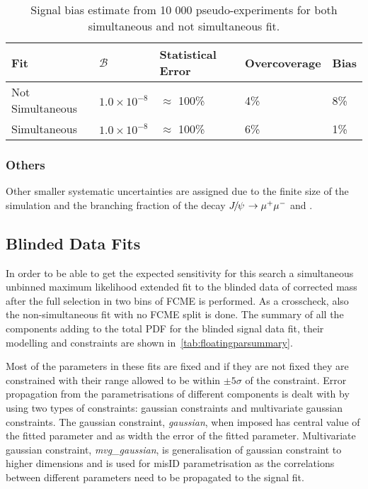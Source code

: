 \begin{table}[H]
\begin{center}
\begin{tabular}{ l  l  l  l  l }
\toprule
        Fit & $\mathcal{B}$ & Statistical Error & Overcoverage & Bias \\
\hline
        Not Simultaneous  & $1.0\times 10^{-8}$ & $\approx$ 100\% & 4\% & 8\%   \\
        Simultaneous  & $1.0\times 10^{-8}$ & $\approx$ 100\% & 6\% & 1\%   \\
\bottomrule
\end{tabular}
\end{center}
\caption{Signal bias estimate from 10 000 pseudo-experiments for both simultaneous and not simultaneous fit.}
\label{tab:biassum}
\end{table}


\subsubsection{Others}
Other smaller systematic uncertainties are assigned due to the finite size of the simulation and the branching fraction of the decay ${{J\mskip -3mu/\mskip -2mu\psi\mskip 2mu}} \rightarrow {\ensuremath{\mu^+\mu^-}}$ and \bjpsik.



\subsection{Blinded Data Fits}
\label{blindeddatafit}
In order to be able to get the expected sensitivity for this search a simultaneous unbinned maximum likelihood extended fit to the blinded data of corrected mass after the full selection in two bins of FCME is performed. As a crosscheck, also the non-simultaneous fit with no FCME split is done. The summary of all the components adding to the total PDF for the blinded signal data fit, their modelling and constraints are shown in~\autoref{tab:floatingparsummary}.

Most of the parameters in these fits are fixed and if they are not fixed they are constrained with their range allowed to be within $\pm5\sigma$ of the constraint. Error propagation from the parametrisations of different components is dealt with by using two types of constraints: gaussian constraints and multivariate gaussian constraints. The gaussian constraint, \textit{gaussian}, when imposed has central value of the fitted parameter and as width the error of the fitted parameter. Multivariate gaussian constraint, \textit{mvg\_gaussian}, is generalisation of gaussian constraint to higher dimensions and is used for misID parametrisation as the correlations between different parameters need to be propagated to the signal fit.

